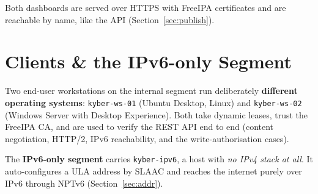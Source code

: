 \documentclass[11pt,a4paper]{article}
\newcommand{\code}[1]{\texttt{#1}}
\begin{document}
Both dashboards are served over HTTPS with FreeIPA certificates and are reachable by name,
like the API (Section~\ref{sec:publish}).

\section{Clients \& the IPv6-only Segment}
\label{sec:clients}

Two end-user workstations on the internal segment run deliberately \textbf{different
operating systems}: \code{kyber-ws-01} (Ubuntu Desktop, Linux) and \code{kyber-ws-02}
(Windows Server with Desktop Experience). Both take dynamic leases, trust the FreeIPA CA, and
are used to verify the REST API end to end (content negotiation, HTTP/2, IPv6 reachability,
and the write-authorisation cases).

The \textbf{IPv6-only segment} carries \code{kyber-ipv6}, a host with \emph{no IPv4 stack at
all}. It auto-configures a ULA address by SLAAC and reaches the internet purely over IPv6
through NPTv6 (Section~\ref{sec:addr}).
\end{document}
